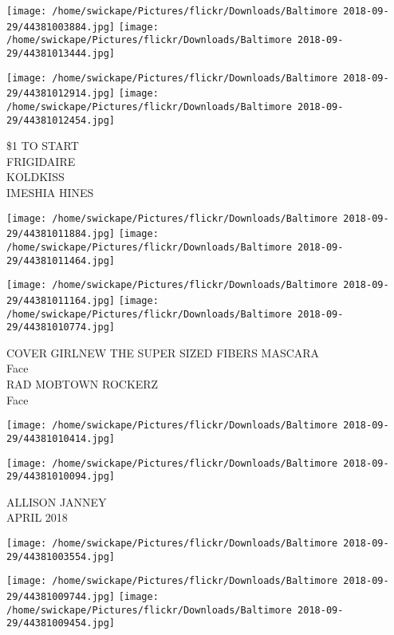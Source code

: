 \documentclass[10pt,letterpaper]{article}
\begin{document}
\texttt{[image: /home/swickape/Pictures/flickr/Downloads/Baltimore 2018-09-29/44381003884.jpg]}
\texttt{[image: /home/swickape/Pictures/flickr/Downloads/Baltimore 2018-09-29/44381013444.jpg]}

\texttt{[image: /home/swickape/Pictures/flickr/Downloads/Baltimore 2018-09-29/44381012914.jpg]}
\texttt{[image: /home/swickape/Pictures/flickr/Downloads/Baltimore 2018-09-29/44381012454.jpg]}

\$1 TO START\\
FRIGIDAIRE\\
KOLDKISS\\
IMESHIA HINES\\
\pagebreak

\texttt{[image: /home/swickape/Pictures/flickr/Downloads/Baltimore 2018-09-29/44381011884.jpg]}
\texttt{[image: /home/swickape/Pictures/flickr/Downloads/Baltimore 2018-09-29/44381011464.jpg]}

\texttt{[image: /home/swickape/Pictures/flickr/Downloads/Baltimore 2018-09-29/44381011164.jpg]}
\texttt{[image: /home/swickape/Pictures/flickr/Downloads/Baltimore 2018-09-29/44381010774.jpg]}

COVER GIRLNEW THE SUPER SIZED FIBERS MASCARA\\
Face\\
RAD MOBTOWN ROCKERZ\\
Face\\
\pagebreak

\texttt{[image: /home/swickape/Pictures/flickr/Downloads/Baltimore 2018-09-29/44381010414.jpg]}

\vspace{0.25in}
\texttt{[image: /home/swickape/Pictures/flickr/Downloads/Baltimore 2018-09-29/44381010094.jpg]}

ALLISON JANNEY\\
APRIL 2018\\
\pagebreak

\texttt{[image: /home/swickape/Pictures/flickr/Downloads/Baltimore 2018-09-29/44381003554.jpg]}

\vspace{0.25in}
\texttt{[image: /home/swickape/Pictures/flickr/Downloads/Baltimore 2018-09-29/44381009744.jpg]}
\texttt{[image: /home/swickape/Pictures/flickr/Downloads/Baltimore 2018-09-29/44381009454.jpg]}
\end{document}
